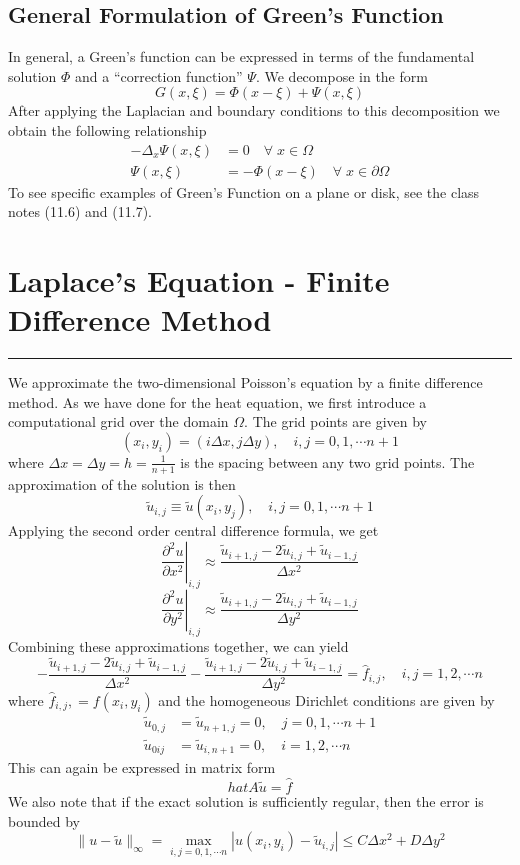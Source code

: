 \documentclass[11pt]{article}
\begin{document}
\subsection{General Formulation of Green's Function}
In general, a Green’s function can be expressed in terms of the fundamental solution $\Phi$ and a “correction function” $\Psi$. We decompose in the form 
$$G(x, \xi) = \Phi (x-\xi) + \Psi (x, \xi) $$ After applying the Laplacian and boundary conditions to this decomposition we obtain the following relationship 
\begin{align*}
- \Delta_x \Psi (x, \xi) &= 0 \quad \forall \; x \in \Omega \\
                  \Psi (x, \xi) &= - \Phi (x-\xi) \quad \forall \; x \in \partial \Omega 
\end{align*}
To see specific examples of Green's Function on a plane or disk, see the class notes (11.6) and (11.7).


\pagebreak

\section{Laplace's Equation - Finite Difference Method}
\hrule \vspace{15pt}

We approximate the two-dimensional Poisson’s equation by a finite difference method. As we have done for the heat equation, we first introduce a computational grid over the domain $\Omega$. The grid points are given by
$$ (x_i, y_i) = (i\Delta x, j \Delta y), \quad i,j = 0,1, \cdots n+1$$
where $\Delta x = \Delta y = h = \frac{1}{n + 1}$ is the spacing between any two grid points. The approximation of the solution is then
$$\tilde{u}_{i,j} \equiv \tilde{u}(x_i, y_j), \quad i,j=0,1, \cdots n+1$$
Applying the second order central difference formula, we get 
$$ \left. \frac{\partial^2 u}{\partial x^2} \right|_{i,j} \approx \frac{\tilde{u}_{i+1,j} - 2\tilde{u}_{i,j} + \tilde{u}_{i-1,j}}{\Delta x^2}$$
$$ \left. \frac{\partial^2 u}{\partial y^2} \right|_{i,j} \approx \frac{\tilde{u}_{i+1,j} - 2\tilde{u}_{i,j} + \tilde{u}_{i-1,j}}{\Delta y^2}$$
Combining these approximations together, we can yield 
$$- \frac{\tilde{u}_{i+1,j} - 2\tilde{u}_{i,j} + \tilde{u}_{i-1,j}}{\Delta x^2} - \frac{\tilde{u}_{i+1,j} - 2\tilde{u}_{i,j} + \tilde{u}_{i-1,j}}{\Delta y^2} = \hat{f}_{i,j}, \quad i,j = 1,2, \cdots n$$ where $\hat{f}_{i,j}, = f(x_i, y_i)$ and the homogeneous Dirichlet conditions are given by
\begin{align*}
 \tilde{u}_{0,j} &= \tilde{u}_{n+1, j} = 0, \quad j=0,1, \cdots n+1 \\
 \tilde{u}_{0ij} &= \tilde{u}_{i, n+1} = 0, \quad i=1, 2,\cdots n
\end{align*}
This can again be expressed in matrix form 
$$ hat{A} \tilde{u} = \hat{f}$$
We also note that if the exact solution is sufficiently regular, then the error is bounded by
$$ \|u-\tilde{u} \|_{\infty} = \max_{i,j=0,1, \cdots n} | u(x_i, y_i) - \tilde{u}_{i,j} | \leq C\Delta x^2 + D \Delta y^2 $$
\pagebreak
\end{document}
